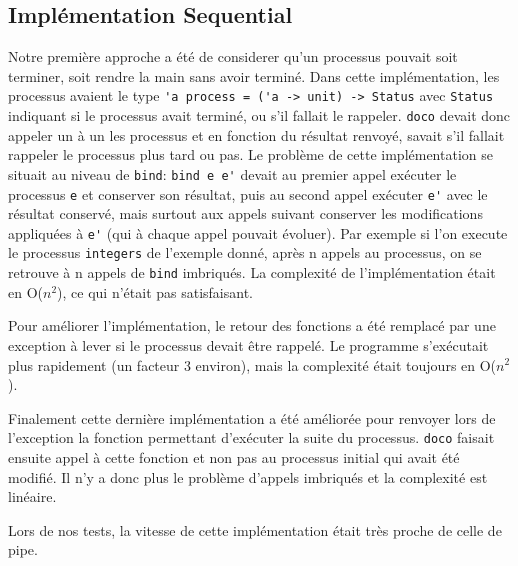 \documentclass[a4paper]{article}
\begin{document}
\subsection{Implémentation Sequential}
Notre première approche a été de considerer qu'un processus pouvait soit
terminer, soit rendre la main sans avoir terminé. Dans cette
implémentation, les processus avaient le type \verb!'a process = ('a -> unit) -> Status! avec \verb!Status! indiquant si le processus avait terminé, ou s'il fallait le rappeler. \verb!doco! devait donc appeler un à un les processus et en fonction du résultat renvoyé, savait s'il fallait rappeler le processus plus tard ou pas. 
Le problème de cette implémentation se situait au niveau de \verb!bind!:
\verb!bind e e'! devait au premier appel exécuter le processus \verb!e! et conserver son résultat, puis au second appel exécuter \verb!e'! avec le résultat conservé, mais surtout aux appels suivant conserver les modifications appliquées à \verb!e'! (qui à chaque appel pouvait évoluer). Par exemple si l'on execute le processus \verb!integers! de l'exemple donné, après n appels au processus, on se retrouve à n appels de \verb!bind! imbriqués. La complexité de l'implémentation était en O($n^2$), ce qui n'était pas satisfaisant.

Pour améliorer l'implémentation, le retour des fonctions a été remplacé par
une exception à lever si le processus devait être rappelé. Le programme
s'exécutait plus rapidement (un facteur 3 environ), mais la complexité était toujours en O($n^2$).

Finalement cette dernière implémentation a été améliorée pour renvoyer lors
de l'exception la fonction permettant d'exécuter la suite du
processus. \verb!doco! faisait ensuite appel à cette fonction et non pas au processus initial qui avait été modifié. Il n'y a donc plus le problème d'appels imbriqués et la complexité est linéaire.

Lors de nos tests, la vitesse de cette implémentation était très proche de celle de pipe.
\end{document}
